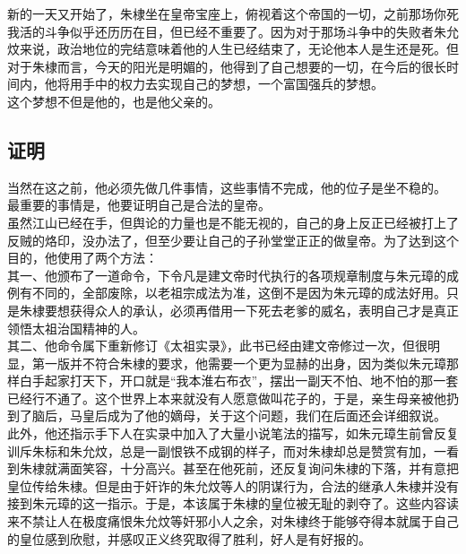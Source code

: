 	\begin{multicols}{\theparacolNo}
\fi
	
新的一天又开始了，朱棣坐在皇帝宝座上，俯视着这个帝国的一切，之前那场你死我活的斗争似乎还历历在目，但已经不重要了。因为对于那场斗争中的失败者朱允炆来说，政治地位的完结意味着他的人生已经结束了，无论他本人是生还是死。但对于朱棣而言，今天的阳光是明媚的，他得到了自己想要的一切，在今后的很长时间内，他将用手中的权力去实现自己的梦想，一个富国强兵的梦想。\\

这个梦想不但是他的，也是他父亲的。\\

\subsection{证明}
当然在这之前，他必须先做几件事情，这些事情不完成，他的位子是坐不稳的。\\

最重要的事情是，他要证明自己是合法的皇帝。\\

虽然江山已经在手，但舆论的力量也是不能无视的，自己的身上反正已经被打上了反贼的烙印，没办法了，但至少要让自己的子孙堂堂正正的做皇帝。为了达到这个目的，他使用了两个方法：\\

其一、他颁布了一道命令，下令凡是建文帝时代执行的各项规章制度与朱元璋的成例有不同的，全部废除，以老祖宗成法为准，这倒不是因为朱元璋的成法好用。只是朱棣要想获得众人的承认，必须再借用一下死去老爹的威名，表明自己才是真正领悟太祖治国精神的人。\\

其二、他命令属下重新修订《太祖实录》，此书已经由建文帝修过一次，但很明显，第一版并不符合朱棣的要求，他需要一个更为显赫的出身，因为类似朱元璋那样白手起家打天下，开口就是“我本淮右布衣”，摆出一副天不怕、地不怕的那一套已经行不通了。这个世界上本来就没有人愿意做叫花子的，于是，亲生母亲被他扔到了脑后，马皇后成为了他的嫡母，关于这个问题，我们在后面还会详细叙说。\\

此外，他还指示手下人在实录中加入了大量小说笔法的描写，如朱元璋生前曾反复训斥朱标和朱允炆，总是一副恨铁不成钢的样子，而对朱棣却总是赞赏有加，一看到朱棣就满面笑容，十分高兴。甚至在他死前，还反复询问朱棣的下落，并有意把皇位传给朱棣。但是由于奸诈的朱允炆等人的阴谋行为，合法的继承人朱棣并没有接到朱元璋的这一指示。于是，本该属于朱棣的皇位被无耻的剥夺了。这些内容读来不禁让人在极度痛恨朱允炆等奸邪小人之余，对朱棣终于能够夺得本就属于自己的皇位感到欣慰，并感叹正义终究取得了胜利，好人是有好报的。\\


\end{multicols}
